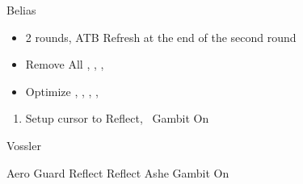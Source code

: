 \begin{battle}{Belias}
\begin{itemize}
\vaanf Reflect Vossler, then pick up chest
\vaanf Reflect \vaan
\item 2 rounds, ATB Refresh at the end of the second round
\item Remove All \vaan, \penelo, \ashe, \basch
\item Optimize \basch, \balthier, \vaan, \ashe, \penelo
\end{itemize}
\end{battle}
\begin{enumerate}
\item Setup cursor to Reflect, \penelo\ Gambit On
\end{enumerate}
\begin{battle}{Vossler}
\begin{itemize}
\ashef Aero Guard
\vaanf Reflect \vaan
\penelof Reflect Ashe
\ashef Gambit On
\end{itemize}
\end{battle}